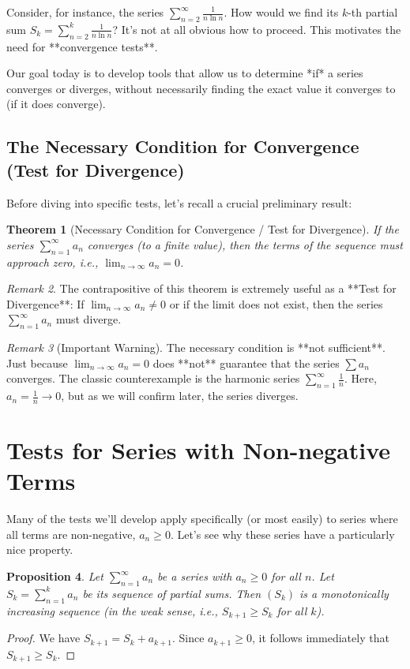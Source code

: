 \documentclass[11pt]{article}
\theoremstyle{plain}
\newtheorem{theorem}{Theorem}[section]
\newtheorem{proposition}[theorem]{Proposition}
\theoremstyle{definition}
\theoremstyle{remark}
\newtheorem{remark}[theorem]{Remark}
\theoremstyle{adminstyle}
\begin{document}
Consider, for instance, the series $\sum_{n=2}^{\infty} \frac{1}{n \ln n}$. How would we find its $k$-th partial sum $S_k = \sum_{n=2}^{k} \frac{1}{n \ln n}$? It's not at all obvious how to proceed. This motivates the need for **convergence tests**.

Our goal today is to develop tools that allow us to determine *if* a series converges or diverges, without necessarily finding the exact value it converges to (if it does converge).

\subsection{The Necessary Condition for Convergence (Test for Divergence)}

Before diving into specific tests, let's recall a crucial preliminary result:

\begin{theorem}[Necessary Condition for Convergence / Test for Divergence]
If the series $\sum_{n=1}^{\infty} a_n$ converges (to a finite value), then the terms of the sequence must approach zero, i.e., $\lim_{n\to\infty} a_n = 0$.
\end{theorem}

\begin{remark}
The contrapositive of this theorem is extremely useful as a **Test for Divergence**: If $\lim_{n\to\infty} a_n \neq 0$ or if the limit does not exist, then the series $\sum_{n=1}^{\infty} a_n$ must diverge.
\end{remark}

\begin{remark}[Important Warning]
The necessary condition is **not sufficient**. Just because $\lim_{n\to\infty} a_n = 0$ does **not** guarantee that the series $\sum a_n$ converges. The classic counterexample is the harmonic series $\sum_{n=1}^{\infty} \frac{1}{n}$. Here, $a_n = \frac{1}{n} \to 0$, but as we will confirm later, the series diverges.
\end{remark}

\section{Tests for Series with Non-negative Terms}

Many of the tests we'll develop apply specifically (or most easily) to series where all terms are non-negative, $a_n \ge 0$. Let's see why these series have a particularly nice property.

\begin{proposition}
Let $\sum_{n=1}^{\infty} a_n$ be a series with $a_n \ge 0$ for all $n$. Let $S_k = \sum_{n=1}^{k} a_n$ be its sequence of partial sums. Then $(S_k)$ is a monotonically increasing sequence (in the weak sense, i.e., $S_{k+1} \ge S_k$ for all $k$).
\end{proposition}
\begin{proof}
We have $S_{k+1} = S_k + a_{k+1}$. Since $a_{k+1} \ge 0$, it follows immediately that $S_{k+1} \ge S_k$.
\end{proof}
\end{document}
